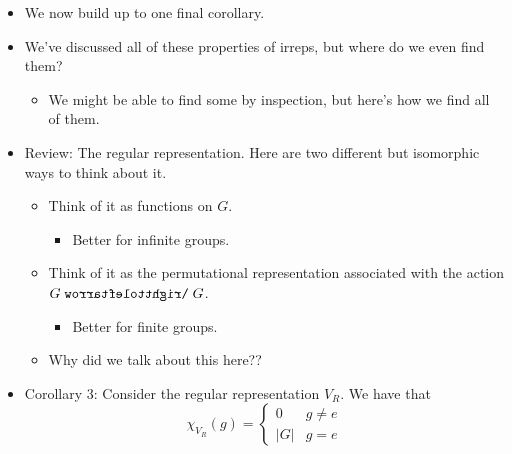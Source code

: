 \documentclass[../notes.tex]{subfiles}
\begin{document}
\begin{itemize}
\begin{proof}
        \begin{equation*}
            1 = \inp{\chi_V,\chi_V}
            = \inp{\sum_{i=1}^kn_i\chi_{V_i},\sum_{i=1}^kn_i\chi_{V_i}}
            = \sum_{i=1}^kn_i^2
        \end{equation*}
        But if $\sum n_i^2=1$ where each $n_i\in\Z^+$, then $n_i=1$ for some $i$ and $n_j=0$ for $j\neq i$, from which it follows that $V\cong V_i$.\par
        We can interconvert between 2 and 3 using the definition of the inner product and the property of complex numbers that $zz^*=|z|^2$.
    \end{proof}
    \item We now build up to one final corollary.
    \item We've discussed all of these properties of irreps, but where do we even find them?
    \begin{itemize}
        \item We might be able to find some by inspection, but here's how we find all of them.
    \end{itemize}
    \item Review: The regular representation. Here are two different but isomorphic ways to think about it.
    \begin{itemize}
        \item Think of it as functions on $G$.
        \begin{itemize}
            \item Better for infinite groups.
        \end{itemize}
        \item Think of it as the permutational representation associated with the action $G\acts G$.
        \begin{itemize}
            \item Better for finite groups.
        \end{itemize}
        \item Why did we talk about this here??
    \end{itemize}
    \item Corollary 3: Consider the regular representation $V_R$. We have that
    \begin{equation*}
        \chi_{V_R}(g) =
        \begin{cases}
            0 & g\neq e\\
            |G| & g=e
        \end{cases}
    \end{equation*}

\end{itemize}
\end{document}

